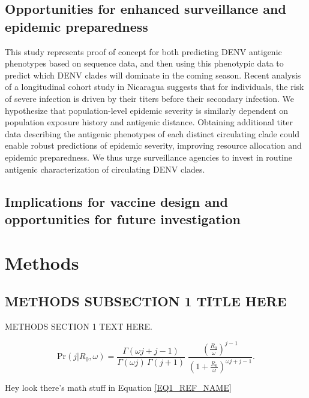 \documentclass[11pt,oneside,letterpaper]{article}
\begin{document}
\subsection*{Opportunities for enhanced surveillance and epidemic preparedness}
This study represents proof of concept for both predicting DENV antigenic phenotypes based on sequence data, and then using this phenotypic data to predict which DENV clades will dominate in the coming season.
Recent analysis of a longitudinal cohort study in Nicaragua suggests that for individuals, the risk of severe infection is driven by their titers before their secondary infection.
We hypothesize that population-level epidemic severity is similarly dependent on population exposure history and antigenic distance.
Obtaining additional titer data describing the antigenic phenotypes of each distinct circulating clade could enable robust predictions of epidemic severity, improving resource allocation and epidemic preparedness.
We thus urge surveillance agencies to invest in routine antigenic characterization of circulating DENV clades.

\subsection*{Implications for vaccine design and opportunities for future investigation}

\newpage

\section*{Methods}
\subsection*{METHODS SUBSECTION 1 TITLE HERE}

METHODS SECTION 1 TEXT HERE.

\begin{equation}
\mathrm{Pr}(j | R_{0}, \omega) = \frac{\Gamma(\omega j+j-1)}{\Gamma(\omega j) \, \Gamma(j+1)} \; \frac{(\frac{R_{0}}{\omega})^{j-1}}{(1+\frac{R_{0}}{\omega})^{\omega j+j-1}}.
\label{EQ1_REF_NAME}
\end{equation}

Hey look there's math stuff in Equation \ref{EQ1_REF_NAME}
\end{document}
